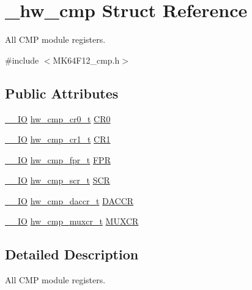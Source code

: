 \hypertarget{struct__hw__cmp}{}\section{\+\_\+hw\+\_\+cmp Struct Reference}
\label{struct__hw__cmp}


All C\+MP module registers.  




{\ttfamily \#include $<$M\+K64\+F12\+\_\+cmp.\+h$>$}

\subsection*{Public Attributes}
\begin{DoxyCompactItemize}
\item 
\hyperlink{core__sc300_8h_aec43007d9998a0a0e01faede4133d6be}{\+\_\+\+\_\+\+IO} \hyperlink{union__hw__cmp__cr0}{hw\+\_\+cmp\+\_\+cr0\+\_\+t} \hyperlink{struct__hw__cmp_abaa10290f1f494df3aea91dbf2abd876}{C\+R0}
\item 
\hyperlink{core__sc300_8h_aec43007d9998a0a0e01faede4133d6be}{\+\_\+\+\_\+\+IO} \hyperlink{union__hw__cmp__cr1}{hw\+\_\+cmp\+\_\+cr1\+\_\+t} \hyperlink{struct__hw__cmp_a851b0709bcfdfe91bdb5d4936d1f4958}{C\+R1}
\item 
\hyperlink{core__sc300_8h_aec43007d9998a0a0e01faede4133d6be}{\+\_\+\+\_\+\+IO} \hyperlink{union__hw__cmp__fpr}{hw\+\_\+cmp\+\_\+fpr\+\_\+t} \hyperlink{struct__hw__cmp_abbf266f17ce2e9c92f5b643496896c79}{F\+PR}
\item 
\hyperlink{core__sc300_8h_aec43007d9998a0a0e01faede4133d6be}{\+\_\+\+\_\+\+IO} \hyperlink{union__hw__cmp__scr}{hw\+\_\+cmp\+\_\+scr\+\_\+t} \hyperlink{struct__hw__cmp_ab60de41ae24fc0597e45f1762272d579}{S\+CR}
\item 
\hyperlink{core__sc300_8h_aec43007d9998a0a0e01faede4133d6be}{\+\_\+\+\_\+\+IO} \hyperlink{union__hw__cmp__daccr}{hw\+\_\+cmp\+\_\+daccr\+\_\+t} \hyperlink{struct__hw__cmp_a6789df9d1a656eb8233915761dc8cc96}{D\+A\+C\+CR}
\item 
\hyperlink{core__sc300_8h_aec43007d9998a0a0e01faede4133d6be}{\+\_\+\+\_\+\+IO} \hyperlink{union__hw__cmp__muxcr}{hw\+\_\+cmp\+\_\+muxcr\+\_\+t} \hyperlink{struct__hw__cmp_a3b890f5539437bb51ae709d1969e8df4}{M\+U\+X\+CR}
\end{DoxyCompactItemize}


\subsection{Detailed Description}
All C\+MP module registers. 

